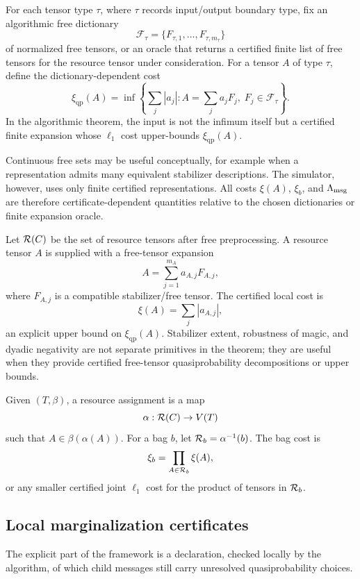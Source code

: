\begin{definition}
For each tensor type \(\tau\), where \(\tau\) records input/output boundary type, fix an algorithmic free dictionary
\[
\mathcal F_\tau=\{F_{\tau,1},\ldots,F_{\tau,m_\tau}\}
\]
of normalized free tensors, or an oracle that returns a certified finite list of free tensors for the resource tensor under consideration. For a tensor \(A\) of type \(\tau\), define the dictionary-dependent cost
\[
\xi_{\mathrm{qp}}(A)
=
\inf\left\{
\sum_j |a_j|:
A=\sum_j a_j F_j,\;
F_j\in\mathcal F_\tau
\right\}.
\]
In the algorithmic theorem, the input is not the infimum itself but a certified finite expansion whose \(\ell_1\) cost upper-bounds \(\xi_{\mathrm{qp}}(A)\).
\end{definition}

Continuous free sets may be useful conceptually, for example when a representation admits many equivalent stabilizer descriptions. The simulator, however, uses only finite certified representations. All costs \(\xi(A)\), \(\xi_b\), and \(\Lambda_{\mathrm{msg}}\) are therefore certificate-dependent quantities relative to the chosen dictionaries or finite expansion oracle.

Let \(\mathcal{R}(C)\) be the set of resource tensors after free preprocessing. A resource tensor \(A\) is supplied with a free-tensor expansion
\[
A=\sum_{j=1}^{m_A} a_{A,j}F_{A,j},
\]
where \(F_{A,j}\) is a compatible stabilizer/free tensor. The certified local cost is
\[
\xi(A)=\sum_j |a_{A,j}|,
\]
an explicit upper bound on \(\xi_{\mathrm{qp}}(A)\). Stabilizer extent, robustness of magic, and dyadic negativity are not separate primitives in the theorem; they are useful when they provide certified free-tensor quasiprobability decompositions or upper bounds.

\begin{definition}
Given \((T,\beta)\), a resource assignment is a map
\[
\alpha:\mathcal{R}(C)\to V(T)
\]
such that \(A\in\beta(\alpha(A))\). For a bag \(b\), let \(\mathcal{R}_b=\alpha^{-1}(b)\). The bag cost is
\[
\xi_b=\prod_{A\in\mathcal{R}_b}\xi(A),
\]
or any smaller certified joint \(\ell_1\) cost for the product of tensors in \(\mathcal{R}_b\).
\end{definition}

\subsection{Local marginalization certificates}

The explicit part of the framework is a declaration, checked locally by the algorithm, of which child messages still carry unresolved quasiprobability choices.

